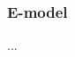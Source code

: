 \documentclass[presentation.tex]{subfiles}
\begin{document}
	
	\begin{frame}
		\frametitle{E-model}
		...
	\end{frame}
	
\end{document}
